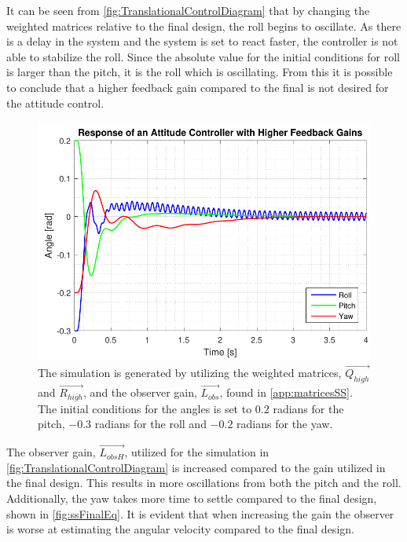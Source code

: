 It can be seen from \autoref{fig:TranslationalControlDiagram} that by changing the weighted matrices relative to the final design, the roll begins to oscillate. As there is a delay in the system and the system is set to react faster, the controller is not able to stabilize the roll. Since the absolute value for the initial conditions for roll is larger than the pitch, it is the roll which is oscillating. From this it is possible to conclude that a higher feedback gain compared to the final is not desired for the attitude control.
%
\begin{figure}[H]
	\centering
	\includegraphics[scale=1]{figures/ssEqBad.pdf}
	\caption{The simulation is generated by utilizing the weighted matrices, $\vec{Q_{high}}$ and $\vec{R_{high}}$, and the observer gain, $\vec{L_{obs}}$, found in \autoref{app:matricesSS}. The initial conditions for the angles is set to $0.2$ radians for the pitch, $-0.3$ radians for the roll and $-0.2$ radians for the yaw.}
	\label{fig:TranslationalControlDiagram}
\end{figure}
%
The observer gain, $\vec{L_{obsH}}$, utilized for the simulation in  \autoref{fig:TranslationalControlDiagram} is increased compared to the gain utilized in the final design. This results in more oscillations from both the pitch and the roll. Additionally, the yaw takes more time to settle compared to the final design, shown in \autoref{fig:ssFinalEq}. It is evident that when increasing the gain the observer is worse at estimating the angular velocity compared to the final design.
%
